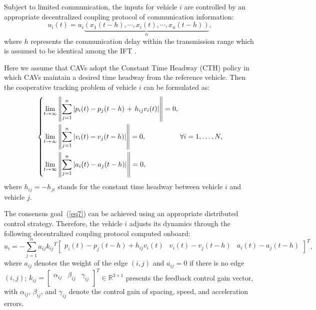 \documentclass[a4paper]{cas-sc}
\begin{document}
Subject to limited communication, the inputs for vehicle $i$ are controlled by an appropriate decentralized coupling protocol of communication information:
\begin{equation}
  {u_i}\left( t \right) = {u_i}\underbrace {\left( {{x_1}\left( {t - h} \right), \cdots ,{x_i}\left( t \right), \cdots ,{x_n}\left( {t - h} \right)} \right)}_n,
  \label{eq6}
\end{equation}
where $h$ represents the communication delay within the transmission range which is assumed to be identical among the IFT \citep{Razzaghpour2022,Sehla2022,Vukadinovic2018a,Vu2020a,Martin-Sacristan2020a}.

Here we assume that CAVs adopt the Constant Time Headway (CTH) policy in which CAVs maintain a desired time headway from the reference vehicle. Then the cooperative tracking problem of vehicle $i$ can be formulated as:
\begin{equation}
  \left\{ \begin{gathered}
    \mathop {\lim }\limits_{t \to \infty } \left\| {\sum\limits_{j = 1}^n {\left| {{p_i}(t) - {p_j}(t - h){\text{ + }}{h_{ij}}{v_i}(t)} \right|} } \right\| = 0, \hfill \\
    \mathop {\lim }\limits_{t \to \infty } \left\| {\sum\limits_{j = 1}^n {\left| {{v_i}(t) - {v_j}(t - h)} \right|} } \right\| = 0, \hfill \\
    \mathop {\lim }\limits_{t \to \infty } \left\| {\sum\limits_{j = 1}^n {\left| {{a_i}(t) - {a_j}(t - h)} \right|} } \right\| = 0, \hfill \\
  \end{gathered}  \right.\forall i = 1, \ldots ,N,
  \label{eq7}
\end{equation}
where ${h_{ij}} =  - {h_{ji}}$ stands for the constant time headway between vehicle $i$ and vehicle $j$.

The consensus goal~(\ref{eq7}) can be achieved using an appropriate distributed control strategy. Therefore, the vehicle $i$ adjusts its dynamics through the following decentralized coupling protocol computed onboard:
\begin{equation}
  {u_i} =  - \sum\limits_{j = 1}^n {{a_{ij}}{k_{ij}}^T{{\left[ {\begin{array}{*{20}{c}}
              {{p_i}\left( t \right) - {p_j}\left( {t - h} \right) + {h_{ij}}{v_i}\left( t \right)} & {{v_i}\left( t \right) - {v_j}\left( {t - h} \right)} & {{a_i}\left( t \right) - {a_j}\left( {t - h} \right)}
            \end{array}} \right]}^T}},
  \label{eq8}
\end{equation}
where $a_{ij}$ denotes the weight of the edge $\left(i,j\right)$ and $a_{ij}=0$ if there is no edge $\left(i,j\right)$; $k_{ij}=\left[\begin{matrix}\alpha_{ij}&\beta_{ij}&\gamma_{ij}\\\end{matrix}\right]^T\in\mathbb{R}^{3\times1}$ presents the feedback control gain vector, with $\alpha_{ij}$, $\beta_{ij}$, and $\gamma_{ij}$ denote the control gain of spacing, speed, and acceleration errors.
\end{document}
